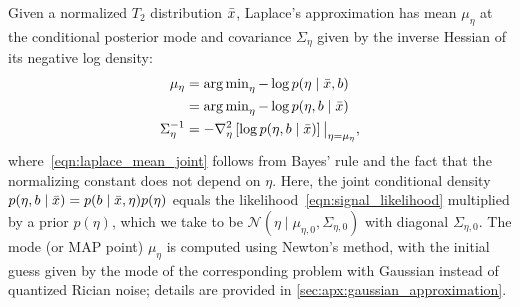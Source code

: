 Given a normalized $T_2$ distribution $\bar{x}$, Laplace's approximation has mean $\mu_{\eta}$ at the conditional posterior mode and covariance $\Sigma_{\eta}$ given by the inverse Hessian of its negative log density:
\begin{align}
    \mu_{\eta}         & = \operatorname{arg\,min}_{\eta} -\log p(\eta \mid \bar{x}, b) \label{eqn:laplace_mean}                                                \\
                       & = \operatorname{arg\,min}_{\eta} -\log p(\eta, b \mid \bar{x}) \label{eqn:laplace_mean_joint}                                          \\
    \Sigma^{-1}_{\eta} & = -\nabla^2_{\eta} \left[ \log p(\eta, b \mid \bar{x}) \right] \big\rvert_{\eta = \mu_{\eta}}, \label{eqn:laplace_cov}
\end{align}
where~\eqref{eqn:laplace_mean_joint} follows from Bayes' rule and the fact that the normalizing constant does not depend on $\eta$.
Here, the joint conditional density $p(\eta, b \mid \bar{x}) = p(b \mid \bar{x}, \eta) p(\eta)$ equals the likelihood~\eqref{eqn:signal_likelihood} multiplied by a prior $p(\eta)$, which we take to be $\mathcal{N}(\eta \mid \mu_{\eta,0}, \Sigma_{\eta,0})$ with diagonal $\Sigma_{\eta,0}$.
The mode (or \gls*{MAP} point) $\mu_{\eta}$ is computed using Newton's method, with the initial guess given by the mode of the corresponding problem with Gaussian instead of quantized Rician noise;
details are provided in \cref{sec:apx:gaussian_approximation}.

